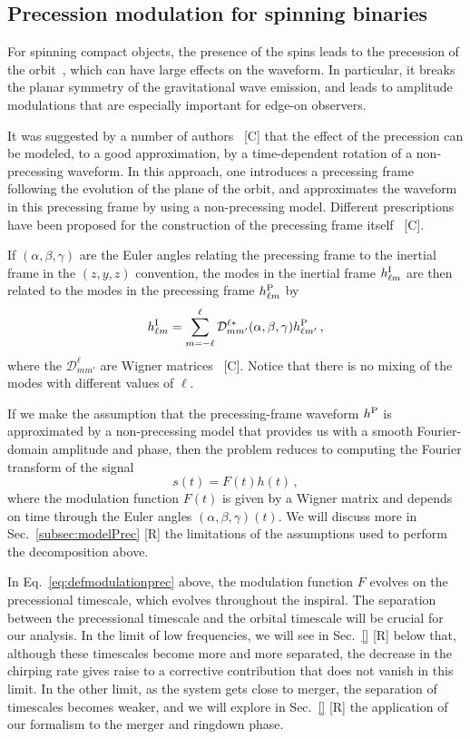 \documentclass[aps,showpacs,twocolumn,
prd,superscriptaddress,nofootinbib]{revtex4-1}
\newcommand{\be}{\begin{equation}}
\newcommand{\ee}{\end{equation}}
\newcommand\calD{{\mathcal{D}}}
\newcommand{\SM}[1]{{\color{Red} #1}}
\begin{document}

\subsection{Precession modulation for spinning binaries}
\label{subsec:modulationPrec}

For spinning compact objects, the presence of the spins leads to the precession of the orbit~\cite{Apostolatos+94, Kidder95}, which can have large effects on the waveform. In particular, it breaks the planar symmetry of the gravitational wave emission, and leads to amplitude modulations that are especially important for edge-on observers.

It was suggested by a number of authors~\cite{} \SM{[C]} that the effect of the precession can be modeled, to a good approximation, by a time-dependent rotation of a non-precessing waveform. In this approach, one introduces a precessing frame following the evolution of the plane of the orbit, and approximates the waveform in this precessing frame by using a non-precessing model. Different prescriptions have been proposed for the construction of the precessing frame itself~\cite{} \SM{[C]}.

If $(\alpha, \beta, \gamma)$ are the Euler angles relating the precessing frame to the inertial frame in the $(z,y,z)$ convention, the modes in the inertial frame $h_{\ell m}^{\rm I}$ are then related to the modes in the precessing frame $h_{\ell m}^{\rm P}$ by~\cite{Goldberg+67}
\be\label{eq:wignerrotintro}
	h_{\ell m}^{\rm I} = \sum\limits_{m=-\ell}^{\ell} \calD^{\ell *}_{mm'} (\alpha,\beta,\gamma) h_{\ell m'}^{\rm P} \,,
\ee
where the $\calD^{\ell}_{mm'}$ are Wigner matrices~\cite{} \SM{[C]}. Notice that there is no mixing of the modes with different values of $\ell$.

If we make the assumption that the precessing-frame waveform $h^{\rm P}$ is approximated by a non-precessing model that provides us with a smooth Fourier-domain amplitude and phase, then the problem reduces to computing the Fourier transform of the signal
\be\label{eq:defmodulationprec}
	s(t) = F(t) h(t) \,,
\ee
where the modulation function $F(t)$ is given by a Wigner matrix and depends on time through the Euler angles $(\alpha, \beta, \gamma)(t)$. We will discuss more in Sec.~\ref{subsec:modelPrec} \SM{[R]} the limitations of the assumptions used to perform the decomposition above.

In Eq.~\eqref{eq:defmodulationprec} above, the modulation function $F$ evolves on the precessional timescale, which evolves throughout the inspiral. The separation between the precessional timescale and the orbital timescale will be crucial for our analysis. In the limit of low frequencies, we will see in Sec.~\ref{} \SM{[R]} below that, although these timescales become more and more separated, the decrease in the chirping rate gives raise to a corrective contribution that does not vanish in this limit. In the other limit, as the system gets close to merger, the separation of timescales becomes weaker, and we will explore in Sec.~\ref{} \SM{[R]} the application of our formalism to the merger and ringdown phase.
\end{document}
